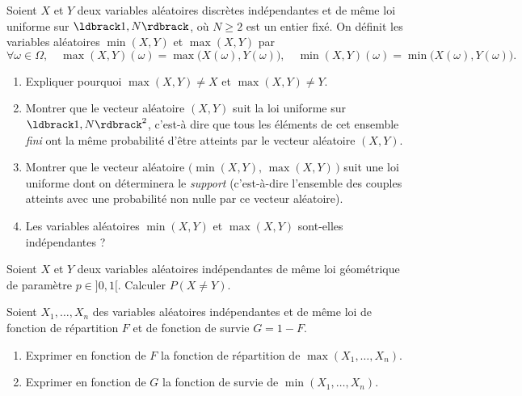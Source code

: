 \documentclass[a4paper,12pt,reqno]{amsart}
\begin{document}


\begin{exo}

  Soient $X$ et $Y$ deux variables aléatoires discrètes indépendantes et de même loi uniforme sur $\iintv{1,N}$, où $N\ge 2$ est un entier fixé. On définit les variables aléatoires $\min(X,Y)$ et $\max(X,Y)$ par
  \[
    \forall \omega\in\Omega, \quad
    \max(X,Y)(\omega)= \max\big(X(\omega),Y(\omega)\big),\quad
    \min(X,Y)(\omega)= \min\big(X(\omega),Y(\omega)\big).
  \]

  \begin{enumerate}
    \item Expliquer pourquoi $\max(X,Y)\neq X$ et $\max(X,Y)\neq Y$.
    \item Montrer que le vecteur aléatoire $(X,Y)$ suit la loi uniforme sur $\iintv{1,N}^2$, c'est-à dire que tous les éléments de cet ensemble \emph{fini} ont la même probabilité d'être atteints par le vecteur aléatoire $(X,Y)$.
    \item Montrer que le vecteur aléatoire $\big(\min(X,Y),\,\max(X,Y)\,\big)$ suit une loi uniforme dont on déterminera le \emph{support} (c'est-à-dire l'ensemble des couples atteints avec une probabilité non nulle par ce vecteur aléatoire).
    \item Les variables aléatoires $\min(X,Y)$ et $\max(X,Y)$ sont-elles indépendantes ?
  \end{enumerate}

\end{exo}


\begin{exo}

  Soient $X$ et $Y$ deux variables aléatoires indépendantes de même loi géométrique de paramètre $p\in]0,1[$. Calculer $P(X\neq Y)$.

\end{exo}


\begin{exo}

  Soient $X_1,\dots, X_n$ des variables aléatoires indépendantes et de même loi de fonction de répartition $F$ et de fonction de survie $G=1-F$.

  \begin{enumerate}
    \item Exprimer en fonction de $F$ la fonction de répartition de $\max(X_1,\dots,X_n)$.
    \item Exprimer en fonction de $G$ la fonction de survie de $\min(X_1,\dots,X_n)$.
  \end{enumerate}

\end{exo}
\end{document}
